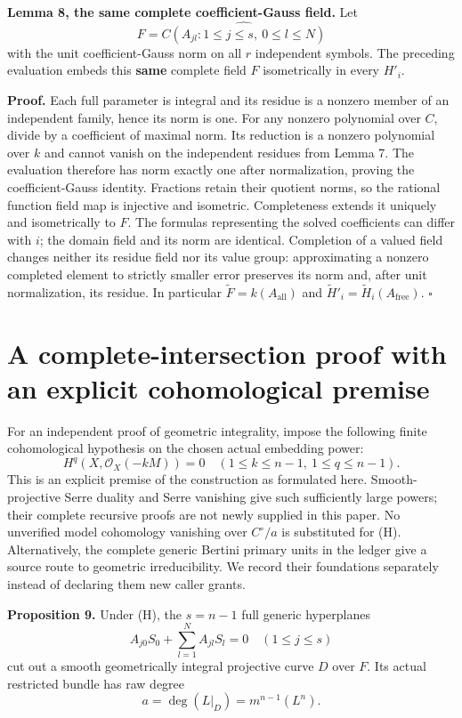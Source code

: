 \documentclass[
  11pt,
]{article}
\begin{document}
\textbf{Lemma 8, the same complete coefficient-Gauss field.} Let \[
 F=\widehat{C(A_{jl}:1\leq j\leq s,\ 0\leq l\leq N)}
\] with the unit coefficient-Gauss norm on all \(r\) independent
symbols. The preceding evaluation embeds this \textbf{same} complete
field \(F\) isometrically in every \(H'_i\).

\textbf{Proof.} Each full parameter is integral and its residue is a
nonzero member of an independent family, hence its norm is one. For any
nonzero polynomial over \(C\), divide by a coefficient of maximal norm.
Its reduction is a nonzero polynomial over \(k\) and cannot vanish on
the independent residues from Lemma 7. The evaluation therefore has norm
exactly one after normalization, proving the coefficient-Gauss identity.
Fractions retain their quotient norms, so the rational function field
map is injective and isometric. Completeness extends it uniquely and
isometrically to \(F\). The formulas representing the solved
coefficients can differ with \(i\); the domain field and its norm are
identical. Completion of a valued field changes neither its residue
field nor its value group: approximating a nonzero completed element to
strictly smaller error preserves its norm and, after unit normalization,
its residue. In particular \(\widetilde F=k(A_{\mathrm{all}})\) and
\(\widetilde H'_i=\widetilde H_i(A_{\mathrm{free}})\). \(\square\)

\section{A complete-intersection proof with an explicit cohomological
premise}\label{a-complete-intersection-proof-with-an-explicit-cohomological-premise}

For an independent proof of geometric integrality, impose the following
finite cohomological hypothesis on the chosen actual embedding power: \[
 H^q(X,\mathcal O_X(-kM))=0
 \quad(1\leq k\leq n-1,\ 1\leq q\leq n-1). \tag{H}
\] This is an explicit premise of the construction as formulated here.
Smooth-projective Serre duality and Serre vanishing give such
sufficiently large powers; their complete recursive proofs are not newly
supplied in this paper. No unverified model cohomology vanishing over
\(C^\circ/a\) is substituted for (H). Alternatively, the complete
generic Bertini primary units in the ledger give a source route to
geometric irreducibility. We record their foundations separately instead
of declaring them new caller grants.

\textbf{Proposition 9.} Under (H), the \(s=n-1\) full generic
hyperplanes \[
 A_{j0}S_0+\sum_{l=1}^NA_{jl}S_l=0\quad(1\leq j\leq s)
\] cut out a smooth geometrically integral projective curve \(D\) over
\(F\). Its actual restricted bundle has raw degree \[
 a=\deg(L|_D)=m^{n-1}(L^n).
\]
\end{document}
